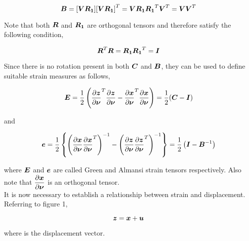 \begin{equation}
  \matr{B}=[\matr{V}\matr{R_{1}}]\transpose{[\matr{V}\matr{R_{1}}]}=\matr{V}\matr{R_{1}}\transpose{\matr{R_{1}}}\transpose{\matr{V}}=\matr{V}\transpose{\matr{V}}
  \label{eqn:leftCauchy}
\end{equation}

\noindent Note that both $\matr{R}$ and $\matr{R_{1}}$ are orthogonal tensors
and therefore satisfy the following condition,

\begin{equation}
  \transpose{\matr{R}}\matr{R}=\matr{R_{1}}\transpose{\matr{R_{1}}}=\matr{I}
  \label{eqn:orthoganality}
\end{equation}

Since there is no rotation present in both $\matr{C}$ and $\matr{B}$, they can
be used to define suitable strain measures as follows,

\begin{equation}
  \matr{E}=\frac{1}{2}\pbrac{\transpose{\delby{\vect{z}}{\vect{\nu}}}\delby{\vect{z}}{\vect{\nu}}-
                       \transpose{\delby{\vect{x}}{\vect{\nu}}}\delby{\vect{x}}{\vect{\nu}}}=
	    \frac{1}{2}(\matr{C}-\matr{I})	       
  \label{eqn:greenstrain}
\end{equation}

\noindent and

\begin{equation}
  \vect{e}=\frac{1}{2}\bbrac{\pbrac{\delby{\vect{x}}{\vect{\nu}}\transpose{\delby{\vect{x}}{\vect{\nu}}}}^{-1}-
                             \pbrac{\delby{\vect{z}}{\vect{\nu}}\transpose{\delby{\vect{z}}{\vect{\nu}}}}^{-1}}=
			     \frac{1}{2}\pbrac{\matr{I}-\matr{B}^{-1}}  
  \label{eqn:almansistrain}
\end{equation}

\noindent where $\matr{E}$ and $\vect{e}$ are called Green and Almansi strain tensors respectively. 
Also note that $\delby{\vect{x}}{\vect{\nu}}$ is an orthogonal tensor. \\

It is now necessary to establish a relationship between strain and displacement. Referring to figure 1, 

\begin{equation}
  \vect{z}=\vect{x}+\vect{u}
  \label{eqn:displacement}
\end{equation}

\noindent where  is the displacement vector. \\

